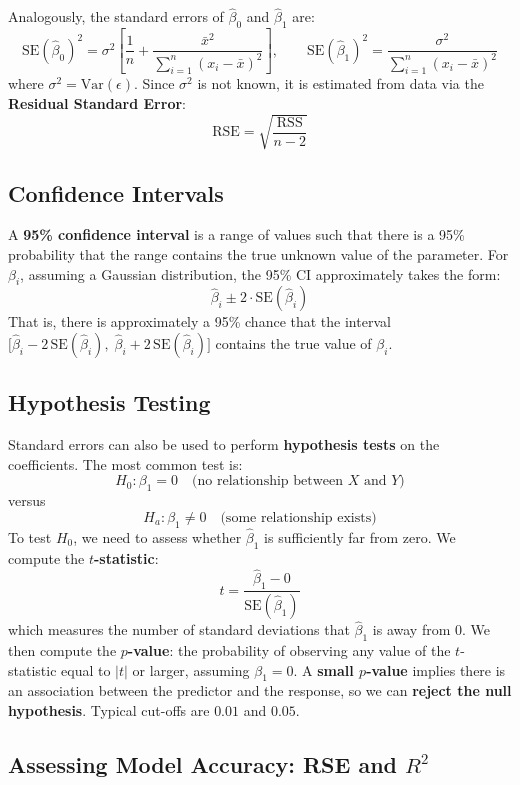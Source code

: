 \documentclass[11pt,a4paper]{article}
\theoremstyle{definition}
\theoremstyle{plain}
\theoremstyle{remark}
\begin{document}
Analogously, the standard errors of $\hat{\beta}_0$ and $\hat{\beta}_1$ are:
\[
    \mathrm{SE}(\hat{\beta}_0)^2 = \sigma^2\!\left[\frac{1}{n} + \frac{\bar{x}^2}{\sum_{i=1}^{n}(x_i - \bar{x})^2}\right], \qquad
    \mathrm{SE}(\hat{\beta}_1)^2 = \frac{\sigma^2}{\sum_{i=1}^{n}(x_i - \bar{x})^2}
\]
where $\sigma^2 = \mathrm{Var}(\epsilon)$. Since $\sigma^2$ is not known, it is estimated from data via the \textbf{Residual Standard Error}:
\[
    \mathrm{RSE} = \sqrt{\frac{\mathrm{RSS}}{n-2}}
\]

\subsection{Confidence Intervals}

A \textbf{95\% confidence interval} is a range of values such that there is a 95\% probability that the range contains the true unknown value of the parameter. For $\beta_i$, assuming a Gaussian distribution, the 95\% CI approximately takes the form:
\[
    \hat{\beta}_i \pm 2 \cdot \mathrm{SE}(\hat{\beta}_i)
\]
That is, there is approximately a 95\% chance that the interval $\bigl[\hat{\beta}_i - 2\,\mathrm{SE}(\hat{\beta}_i),\; \hat{\beta}_i + 2\,\mathrm{SE}(\hat{\beta}_i)\bigr]$ contains the true value of $\beta_i$.

\subsection{Hypothesis Testing}

Standard errors can also be used to perform \textbf{hypothesis tests} on the coefficients. The most common test is:
\[
    H_0: \beta_1 = 0 \quad \text{(no relationship between } X \text{ and } Y\text{)}
\]
versus
\[
    H_a: \beta_1 \neq 0 \quad \text{(some relationship exists)}
\]
To test $H_0$, we need to assess whether $\hat{\beta}_1$ is sufficiently far from zero. We compute the \textbf{$t$-statistic}:
\[
    t = \frac{\hat{\beta}_1 - 0}{\mathrm{SE}(\hat{\beta}_1)}
\]
which measures the number of standard deviations that $\hat{\beta}_1$ is away from 0. We then compute the \textbf{$p$-value}: the probability of observing any value of the $t$-statistic equal to $|t|$ or larger, assuming $\beta_1 = 0$. A \textbf{small $p$-value} implies there is an association between the predictor and the response, so we can \textbf{reject the null hypothesis}. Typical cut-offs are $0.01$ and $0.05$.

\subsection{Assessing Model Accuracy: RSE and \texorpdfstring{$R^2$}{R2}}
\end{document}
